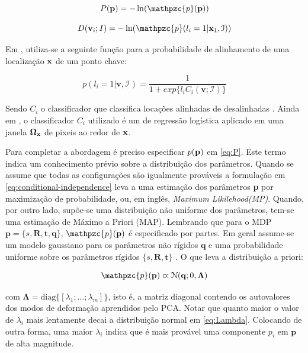 {\begin{equation}
\label{eq:P}
P(\mathbf{p}) = 
-\ln
(
\mathpzc{p}(\mathbf{p})
)
\end{equation}

\begin{equation}
D(\mathbf{v}_i; I) =
-\ln
(
\mathpzc{p}(l_i=1 | \mathbf{x}_1, \mathcal{I})
)
\end{equation}

Em \cite{facetracker}, utiliza-se a seguinte função para a probabilidade de alinhamento de uma localização $\bf{x}$ de um ponto chave: 

\begin{equation}
p(l_i = 1|\textbf{v},\mathcal{I}) = \frac{1}{1 + exp{\{}l_iC_i(\textbf{v};\mathcal{I}){\}}}
\label{eq:alg1}
\end{equation}

Sendo $C_i$ o classificador que classifica locações alinhadas de desalinhadas \cite{saragih2011deformable}. Ainda em \cite{facetracker}, o classificador $C_i$ utilizado é um de regressão logística aplicado em uma janela $\bf{\Omega_x}$ de pixeis ao redor de $\bf{x}$.

Para completar a abordagem é preciso especificar $p(\bf{p})$ em \ref{eq:P}. Este termo indica um conhecimento prévio sobre a distribuição dos parâmetros. Quando se assume que todas as configurações são igualmente prováveis a formulação em \ref{eq:conditional-independence}
 leva a uma estimação dos parâmetros \textbf{p} por maximização de probabilidade, ou, em inglês, \textit{Maximum Likilehood(MP)}. Quando, por outro lado, supõe-se uma distribuição não uniforme dos parâmetros, tem-se uma estimação de Máximo a Priori (MAP)\cite{saragih2011deformable}. Lembrando que para o MDP $\mathbf{p}=\{s,\mathbf{R},\mathbf{t},\mathbf{q}\}$, $\mathpzc{p}(\mathbf{p})$ é especificado por partes. Em geral assume-se um modelo gaussiano para os parâmetros não rígidos $\mathbf{q}$ e uma probabilidade uniforme sobre os parâmetros rígidos $\{s,\mathbf{R},\mathbf{t}\}$ \cite{facetracker}. O que leva a distribuição a priori:

\begin{equation}
\mathpzc{p}(\mathbf{p}) \varpropto \mathcal{N}(\mathbf{q}; 0, \mathbf{\Lambda})
\label{eq:Lambda}
\end{equation}

com $\mathbf{\Lambda} = \text{diag}\{[ \lambda_1; \ldots; \lambda_m]\}$, isto é, a matriz diagonal contendo os autovalores dos modos de deformação aprendidos pelo PCA. Notar que quanto maior o valor de $\lambda_i$ mais lentamente decai a distribuição normal em \ref{eq:Lambda}. Colocando de outra forma, uma maior $\lambda_i$ indica que é mais provável uma componente $p_i$ em $\mathbf{p}$ de alta magnitude.


}
